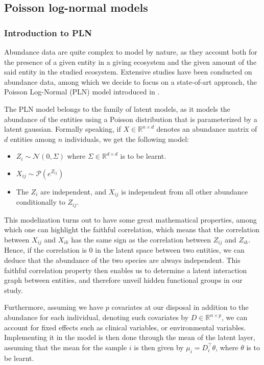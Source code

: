\subsection{Poisson log-normal models}

\subsubsection{Introduction to PLN}

Abundance data are quite complex to model by nature, as they account both for the presence of a given entity in a
giving ecosystem and the given amount of the said entity in the studied ecosystem.
Extensive studies have been conducted on abundance data, among which we decide to focus on a state-of-art approach,
the Poisson Log-Normal (PLN) model introduced in \cite{PLN_chiquet}.

The PLN model belongs to the family of latent models, as it models the abundance of the entities using a Poisson distribution
that is parameterized by a latent gaussian.
Formally speaking, if $X \in \mathbb{R}^{n \times d}$ denotes an abundance matrix of $d$ entities among $n$ individuals, we get the following model:
\begin{itemize}
    \item $Z_i \sim \mathcal{N}(0, \Sigma)$ where $\Sigma \in \mathbb{R}^{d \times d}$ is to be learnt.
    \item $X_{ij} \sim \mathcal{P}(e^{Z_{ij}})$
    \item The $Z_i$ are independent, and $X_{ij}$ is independent from all other abundance conditionally to $Z_{ij}$.
\end{itemize}

This modelization turns out to have some great mathematical properties, among which one can highlight the faithful correlation, which means that
the correlation between $X_{ij}$ and $X_{ik}$ has the same sign as the correlation between $Z_{ij}$ and $Z_{ik}$.
Hence, if the correlation is $0$ in the latent space between two entities, we can deduce that the abundance of the two species are always independent.
This faithful correlation property then enables us to determine a latent interaction graph between entities, and therefore unveil hidden functional groups in our study.

\medskip

Furthermore, assuming we have $p$ covariates at our disposal in addition to the abundance for each individual, denoting such covariates by $D \in \mathbb{R}^{n \times p}$,
we can account for fixed effects such as clinical variables, or environmental variables.
Implementing it in the model is then done through the mean of the latent layer, assuming that the mean for the sample $i$ is then given by $\mu_i = D_i^\top \theta$, where $\theta$ is to be learnt.

